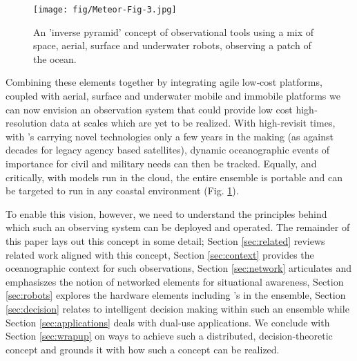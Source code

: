 \begin{figure}[!]
  \centering
  \texttt{[image: fig/Meteor-Fig-3.jpg]}
  \caption{An 'inverse pyramid' concept of observational tools using a
    mix of space, aerial, surface and underwater robots, observing a
    patch of the ocean.}
  \label{fig:concept-2}
\end{figure}


Combining these elements together by integrating agile low‐cost \sml
platforms, coupled with aerial, surface and underwater mobile and
immobile platforms we can now envision an observation system that
could provide low cost high‐resolution data at scales which are yet to
be realized. With high-revisit times, with \smle's carrying novel
technologies only a few years in the making (as against decades for
legacy agency based satellites), dynamic oceanographic events of
importance for civil and military needs can then be tracked. Equally,
and critically, with models run in the cloud, the entire ensemble is
portable and can be targeted to run in any coastal environment
(Fig. \ref{fig:concept-2}).

To enable this vision, however, we need to understand the principles
behind which such an observing system can be deployed and
operated. The remainder of this paper lays out this concept in some
detail; Section \ref{sec:related} reviews related work aligned with
this concept, Section \ref{sec:context} provides the oceanographic
context for such observations, Section \ref{sec:network} articulates
and emphasiszes the notion of networked elements for situational
awareness, Section \ref{sec:robots} explores the hardware elements
including \smle's in the ensemble, Section \ref{sec:decision} relates
to intelligent decision making within such an ensemble while Section
\ref{sec:applications} deals with dual-use applications. We conclude
with Section \ref{sec:wrapup} on ways to achieve such a distributed,
decision-theoretic concept and grounds it with how such a concept can
be realized.
